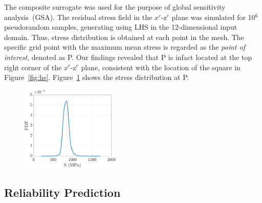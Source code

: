 The composite surrogate was used for the purpose of global sensitivity analysis~(GSA). The residual stress
field in the $x^c$-z$^c$ plane was simulated for 10$^6$ pseudorandom samples, generating using LHS
in the 12-dimensional input domain. Thus, stress distribution is obtained at each point in the mesh. 
The specific grid point with the maximum mean stress is regarded as the \textit{point of interest},
denoted as P. Our findings revealed that P is infact located at the top right corner of the $x^c$-z$^c$
plane, consistent with the location of the square in Figure~\ref{fig:hs}.
Figure~\ref{fig:kde_S} shows the stress distribution at P. 
%
\begin{figure}[htbp]
\begin{center}
\includegraphics[width=0.42\textwidth]{./Figures/kde_S_mumax}
\end{center}
\caption{}
\label{fig:kde_S}
\end{figure}
%

\subsection{Reliability Prediction}
\label{sub:reliability}




 
